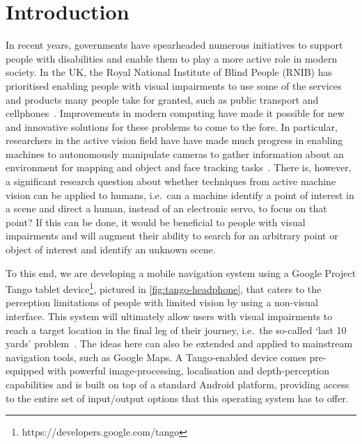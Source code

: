 \documentclass[sigconf, screen=true, anonymous=true]{acmart}
\begin{document}


\maketitle
\renewcommand{\shortauthors}{JC Lock et al.}

\section{Introduction}

In recent years, governments have spearheaded numerous initiatives to support people with disabilities and enable them to play a more active role in modern society.
In the UK, the Royal National Institute of Blind People (RNIB) has prioritised enabling people with visual impairments to use some of the services and products many people take for granted, such as public transport and cellphones~\cite{rnib-objectives}.
Improvements in modern computing have made it possible for new and innovative solutions for these problems to come to the fore.
In particular, researchers in the active vision field have have made much progress in enabling machines to autonomously manipulate cameras to gather information about an environment for mapping and object and face tracking tasks~\cite{bajcsy2018revisiting}.
There is, however, a significant research question about whether techniques from active machine vision can be applied to humans, i.e.\ can a machine identify a point of interest in a scene and direct a human, instead of an electronic servo, to focus on that point?
If this can be done, it would be beneficial to people with visual impairments and will augment their ability to search for an arbitrary point or object of interest and identify an unknown scene. 

To this end, we are developing a mobile navigation system using a Google Project Tango tablet device\footnote{https://developers.google.com/tango}, pictured in \cref{fig:tango-headphone}, that caters to the perception limitations of people with limited vision by using a non-visual interface.
This system will ultimately allow users with visual impairments to reach a target location in the final leg of their journey, i.e.\ the so-called `last 10 yards' problem~\cite{google2016blind,bellotto2013}. 
The ideas here can also be extended and applied to mainstream navigation tools, such as Google Maps.
A Tango-enabled device comes pre-equipped with powerful image-processing, localisation and depth-perception capabilities and is built on top of a standard Android platform, providing access to the entire set of input/output options that this operating system has to offer.
\end{document}
